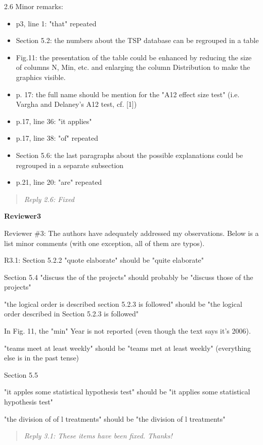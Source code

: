 \documentclass[smallcondensed]{svjour3}
\newcommand{\bi}{\begin{itemize}}%
\newcommand{\ei}{\end{itemize}}
\begin{document}
2.6 Minor remarks:

\bi
\item p3, line 1: "that" repeated

\item Section 5.2: the numbers about the TSP database can be regrouped in a table
\item Fig.11: the presentation of the table could be enhanced by reducing the size of columns N, Min, etc. and enlarging the column Distribution to make the graphics visible.
\item p. 17: the full name should be mention for the "A12 effect size test" (i.e. Vargha and Delaney's A12 test, cf. [1])
\item p.17, line 36: "it applies"
\item p.17, line 38: "of" repeated
\item Section 5.6: the last paragraphs about the possible explanations could be regrouped in a separate subsection
\item p.21, line 20: "are" repeated
\ei
\begin{quote}{\em 
Reply 2.6: Fixed
}\end{quote}

{\bf Reviewer3}

Reviewer \#3: The authors have adequately addressed my observations. Below is a list minor comments (with one exception, all of them are typos).

R3.1: Section 5.2.2
"quote elaborate" should be "quite elaborate"

Section 5.4
"discuss the of the projects" should probably be "discuss those of the projects"

"the logical order is described section 5.2.3 is followed" should be "the logical order described in Section 5.2.3 is followed"

In Fig. 11, the "min" Year is not reported (even though the text says it's 2006).

"teams meet at least weekly" should be "teams met at least weekly" (everything else is in the past tense)

Section 5.5

"it apples some statistical hypothesis test" should be "it applies some statistical hypothesis test"

"the division of of l treatments" should be "the division of l treatments"

\begin{quote}{\em 
Reply 3.1: These items have been fixed. Thanks!
}\end{quote}
\end{document}

